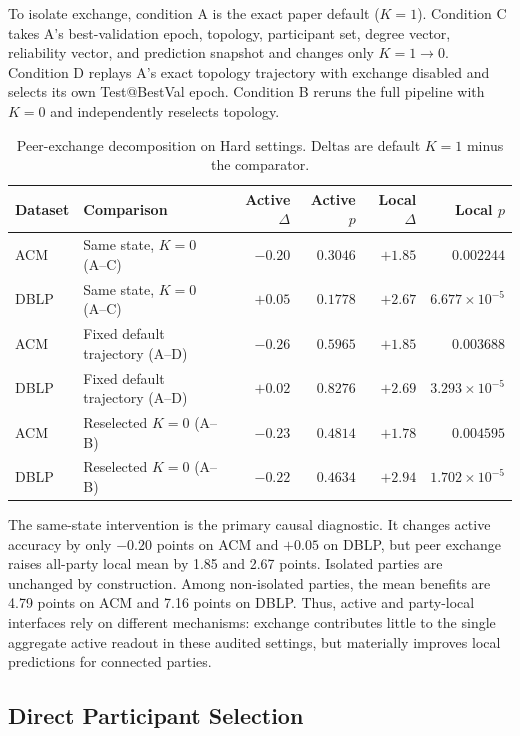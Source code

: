 \documentclass[letterpaper]{article}
\begin{document}
To isolate exchange, condition A is the exact paper default ($K=1$). Condition C
takes A's best-validation epoch, topology, participant set, degree vector,
reliability vector, and prediction snapshot and changes only
$K=1\rightarrow0$. Condition D replays A's exact topology trajectory with
exchange disabled and selects its own Test@BestVal epoch. Condition B reruns the
full pipeline with $K=0$ and independently reselects topology.

\begin{table}[!t]
\centering
\scriptsize
\setlength{\tabcolsep}{3.6pt}
\caption{Peer-exchange decomposition on Hard settings. Deltas are default
$K=1$ minus the comparator.}
\label{tab:supp-exchange-decomposition}
\begin{tabular}{llrrrr}
\toprule
Dataset & Comparison & Active $\Delta$ & Active $p$ & Local $\Delta$ & Local $p$ \\
\midrule
ACM & Same state, $K=0$ (A--C) & $-0.20$ & $0.3046$ & $+1.85$ & $0.002244$ \\
DBLP & Same state, $K=0$ (A--C) & $+0.05$ & $0.1778$ & $+2.67$ & $6.677{\times}10^{-5}$ \\
ACM & Fixed default trajectory (A--D) & $-0.26$ & $0.5965$ & $+1.85$ & $0.003688$ \\
DBLP & Fixed default trajectory (A--D) & $+0.02$ & $0.8276$ & $+2.69$ & $3.293{\times}10^{-5}$ \\
ACM & Reselected $K=0$ (A--B) & $-0.23$ & $0.4814$ & $+1.78$ & $0.004595$ \\
DBLP & Reselected $K=0$ (A--B) & $-0.22$ & $0.4634$ & $+2.94$ & $1.702{\times}10^{-5}$ \\
\bottomrule
\end{tabular}
\end{table}

The same-state intervention is the primary causal diagnostic. It changes active
accuracy by only $-0.20$ points on ACM and $+0.05$ on DBLP, but peer exchange
raises all-party local mean by 1.85 and 2.67 points. Isolated parties are
unchanged by construction. Among non-isolated parties, the mean benefits are
4.79 points on ACM and 7.16 points on DBLP. Thus, active and party-local
interfaces rely on different mechanisms: exchange contributes little to the
single aggregate active readout in these audited settings, but materially
improves local predictions for connected parties.

\subsection{Direct Participant Selection}
\end{document}
